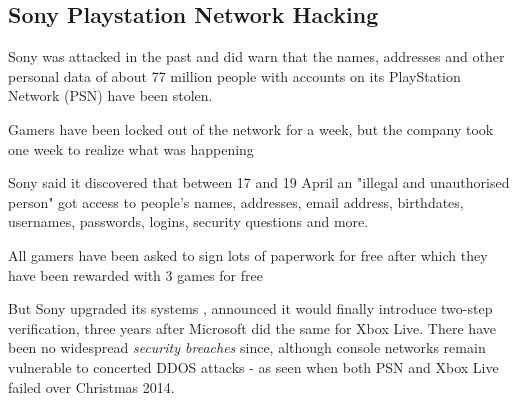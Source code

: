 \documentclass[a4paper,12pt]{article}
\begin{document}
\subsection{Sony Playstation Network Hacking}

Sony was attacked in the past and did warn that the names, addresses and other personal data of about 77 million people with accounts on its PlayStation Network (PSN) have been stolen.

Gamers have been locked out of the network for a week, but the company took one week to realize what was happening

Sony said it discovered that between 17 and 19 April an "illegal and unauthorised person" got access to people's names, addresses, email address, birthdates, usernames, passwords, logins, security questions and more.

All gamers have been asked to sign lots of paperwork for free after which they have been rewarded with 3 games for free

But Sony upgraded its systems , announced it would finally introduce two-step verification, three years after Microsoft did the same for Xbox Live. There have been no widespread \emph{security breaches} since, although console networks remain vulnerable to concerted DDOS attacks - as seen when both PSN and Xbox Live failed over Christmas 2014.
\end{document}
